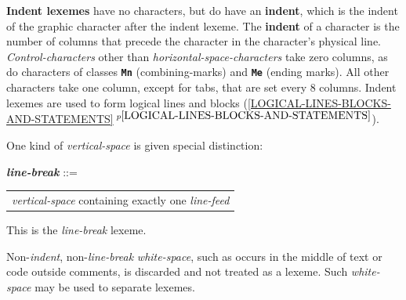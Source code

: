 \documentclass[12pt]{article}
\newcommand{\TT}[1]{{\tt \bfseries #1}}
\newcommand{\key}[1]{{\rm \bfseries #1}}
\newcommand{\emkey}[1]{{\em \bfseries #1}}
\newcommand{\itemref}[1]{\ref{#1}$\,^{p\pageref{#1}}$}
\newenvironment{indpar}[1][0.3in]%
	{\begin{list}{}%
		     {\setlength{\itemsep}{0in}%
		      \setlength{\topsep}{0in}%
		      \setlength{\parsep}{1ex}%
		      \setlength{\labelwidth}{#1}%
		      \setlength{\leftmargin}{#1}%
		      \addtolength{\leftmargin}{\labelsep}}%
	 \item}%
	{\end{list}}
\begin{document}
\key{Indent lexemes} have no characters, but
do have an \key{indent}, which is the indent of
the graphic character after the indent lexeme.
The \key{indent} of a character is the number
of columns that precede the character in the character's physical line.
{\em Control-characters} other than {\em horizontal-space-characters}
take zero columns, as do characters of classes \TT{Mn} (combining-marks)
and \TT{Me} (ending marks).  All other characters take one column,
except for tabs, that are set every 8 columns.
Indent lexemes are used to form logical lines and blocks
(\itemref{LOGICAL-LINES-BLOCKS-AND-STATEMENTS}).

One kind of {\em vertical-space} is given special distinction:
\begin{indpar}
\emkey{line-break}\label{LINE-BREAK} ::=
	\begin{tabular}[t]{l}
        {\em vertical-space} containing exactly one {\em line-feed}
	\end{tabular}
\end{indpar}

This is the {\em line-break} lexeme.

Non-{\em indent}, non-{\em line-break} {\em white-space}, such as occurs
in the middle of text or code outside comments, is discarded and not treated
as a lexeme.  Such {\em white-space} may be used to separate lexemes.
\end{document}
